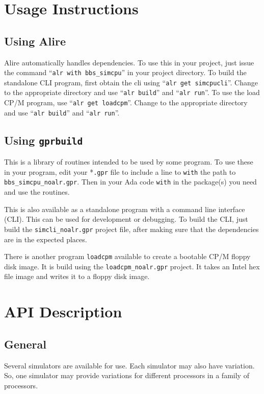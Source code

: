 \documentclass[10pt, openany]{book}
\newcommand{\keyword}[1]{\texttt{#1}}
\begin{document}
\chapter{Usage Instructions}


\section{Using Alire}
Alire automatically handles dependencies.  To use this in your project, just issue the command ``\keyword{alr with bbs\_simcpu}'' in your project directory.  To build the standalone CLI program, first obtain the cli using ``\keyword{alr get simcpucli}''.  Change to the appropriate directory and use ``\keyword{alr build}'' and ``\keyword{alr run}''.  To use the load CP/M program, use ``\keyword{alr get loadcpm}''.  Change to the appropriate directory and use ``\keyword{alr build}'' and ``\keyword{alr run}''.

\section{Using \keyword{gprbuild}}
This is a library of routines intended to be used by some program.  To use these in your program, edit your *\keyword{.gpr} file to include a line to \keyword{with} the path to \keyword{bbs\_simcpu\_noalr.gpr}.  Then in your Ada code \keyword{with} in the package(s) you need and use the routines.

This is also available as a standalone program with a command line interface (CLI).  This can be used for development or debugging.  To build the CLI, just build the \keyword{simcli\_noalr.gpr} project file, after making sure that the dependencies are in the expected places.

There is another program \keyword{loadcpm} available to create a bootable CP/M floppy disk image.  It is build using the \keyword{loadcpm\_noalr.gpr} project.  It takes an Intel hex file image and writes it to a floppy disk image.

\chapter{API Description}
\section{General}
Several simulators are available for use.  Each simulator may also have variation.  So, one simulator may provide variations for different processors in a family of processors.
\end{document}
